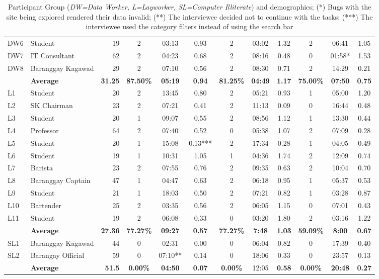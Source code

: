 \documentclass{sigchi}
\begin{document}
\begin{table}[t]
{\begin{tabular}{llr|ccc|ccc|ccc}
DW6 & Student & 19 & 2 & 03:13 & 0.93 & 2 & 03:02 & 1.32 & 2 & 06:41 & 1.05 \\
DW7 & IT Consultant & 62 & 2 & 04:23 & 0.68 & 2 & 08:16 & 0.48 & 0 & 01:58* & 1.53 \\
DW8 & Baranggay Kagawad & 29 & 2 & 07:10 & 0.56 & 2 & 08:30 & 0.71 & 2 & 14:29 & 0.21 \\
 & \textbf{Average}  & \textbf{31.25}  & \textbf{87.50\%}  & \textbf{05:19} & \textbf{0.94}  & \textbf{81.25\%}  & \textbf{04:49} & \textbf{1.17}  & \textbf{75.00\%}  & \textbf{07:50} & \textbf{0.75}  \\ 
\midrule
L1 & Student & 20 & 2 & 13:45 & 0.80 & 2 & 05:21 & 0.93 & 1 & 05:00 & 1.20 \\
L2 & SK Chairman & 23 & 2 & 07:21 & 0.41 & 2 & 11:13 & 0.09 & 0 & 16:44 & 0.48 \\
L3 & Student & 20 & 1 & 09:07 & 0.55 & 2 & 08:56 & 1.12 & 1 & 13:30 & 0.44 \\
L4 & Professor & 64 & 2 & 07:40 & 0.52 & 0 & 05:38 & 1.07 & 2 & 07:09 & 0.28 \\
L5 & Student & 20 & 1 & 15:08 & 0.13*** & 2 & 17:34 & 0.28 & 1 & 04:05 & 0.49 \\
L6 & Student & 19 & 1 & 10:31 & 1.05 & 1 & 04:36 & 1.74 & 2 & 12:09 & 0.74 \\
L7 & Barista & 23 & 2 & 07:55 & 0.76 & 2 & 09:35 & 0.63 & 2 & 10:04 & 0.70 \\
L8 & Baranggay Captain & 47 & 1 & 04:47 & 0.63 & 2 & 06:18 & 0.95 & 1 & 05:37 & 0.53 \\
L9 & Student & 21 & 1 & 18:03 & 0.50 & 2 & 07:21 & 0.82 & 1 & 03:28 & 0.87 \\
L10 & Bartender & 25 & 2 & 03:35 & 0.56 & 2 & 06:05 & 1.15 & 0 & 07:01 & 0.43 \\
L11 & Student & 19 & 2 & 06:08 & 0.33 & 0 & 03:20 & 1.80 & 2 & 03:16 & 1.22 \\
 & \textbf{Average}  & \textbf{27.36}  & \textbf{77.27\%}  & \textbf{09:27} & \textbf{0.57}  & \textbf{77.27\%}  & \textbf{7:48} & \textbf{1.03}  & \textbf{59.09\%}  & \textbf{8:00} & \textbf{0.67}  \\ 
\midrule
SL1 & Baranggay Kagawad & 44 & 0 & 02:31 & 0.00 & 0 & 06:04 & 0.82 & 0 & 17:39 & 0.40 \\
SL2 & Barangay Official & 59 & 0 & 07:10** & 0.14 & 0 & 18:06 & 0.33 & 0 & 23:57 & 0.13 \\
 & \textbf{Average}  & \textbf{51.5}  & \textbf{0.00\%}  & \textbf{04:50} & \textbf{0.07} & \textbf{0.00\%}  & 12:05 & \textbf{0.58}  & \textbf{0.00\%}  & \textbf{20:48} & \textbf{0.27} \\
 \bottomrule
\end{tabular}%
}
\caption{Participant Group (\textit{DW=Data Worker, L=Layworker, SL=Computer Illiterate}) and demographics; (*) Bugs with the site being explored rendered their data invalid; (**) The interviewee decided not to continue with the tasks; (***) The interviewee used the category filters instead of using the search bar}
\label{tab:participants}
\end{table}
\end{document}
